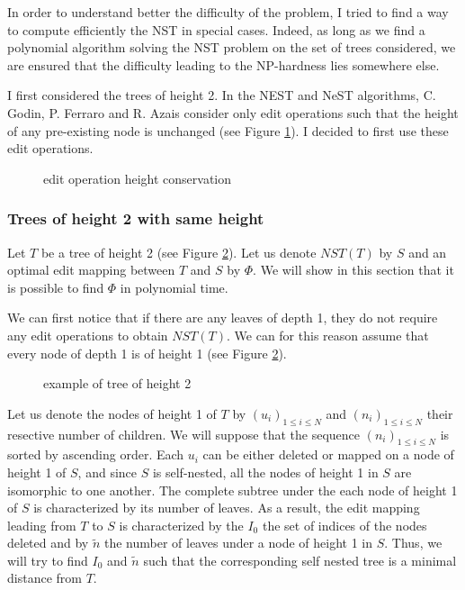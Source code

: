 In order to understand better the difficulty of the problem, I tried
to find a way to compute efficiently the NST in special cases. Indeed,
as long as we find a polynomial algorithm solving the NST problem on
the set of trees considered, we are ensured that the difficulty
leading to the NP-hardness lies somewhere else.

I first considered the trees of height 2. In the NEST and NeST
algorithms, C. Godin, P. Ferraro and R. Azais consider only edit
operations such that the height of any pre-existing node is unchanged
(see Figure \ref{fig:edit_height}). I decided to first use these edit
operations.
\begin{figure}
  \centering
  
  \caption{edit operation height conservation}
  \label{fig:edit_height}
\end{figure}

\subsubsection{Trees of height 2 with same height} 
Let $T$ be a tree of height 2 (see Figure \ref{fig:height2}). Let us
denote $NST(T)$ by $S$ and an optimal edit mapping between $T$ and $S$
by $\Phi$. We will show in this section that it is possible to find
$\Phi$ in polynomial time.  

We can first notice that if there are any leaves of depth 1, they do
not require any edit operations to obtain $NST(T)$. We can for this
reason assume that every node of depth 1 is of height 1 (see Figure
\ref{fig:height2}).

\begin{figure}
  \centering
  
  \caption{example of tree of height 2}
  \label{fig:height2}
\end{figure}

Let us denote the nodes of height 1 of $T$ by
$(u_{i})_{1 \leqslant i \leqslant N}$ and
$(n_{i})_{1 \leqslant i \leqslant N}$ their resective number of
children. We will suppose that the sequence
$(n_{i})_{1 \leqslant i \leqslant N}$ is sorted by ascending
order. Each $u_{i}$ can be either deleted or mapped on a node of
height 1 of $S$, and since $S$ is self-nested, all the nodes of height
1 in $S$ are isomorphic to one another. The complete subtree under the
each node of height 1 of $S$ is characterized by its number of
leaves. As a result, the edit mapping leading from $T$ to $S$ is
characterized by the $I_{0}$ the set of indices of the nodes deleted
and by $\tilde{n}$ the number of leaves under a node of height 1 in
$S$. Thus, we will try to find $I_{0}$ and $\tilde{n}$ such that the
corresponding self nested tree is a minimal distance from $T$.

